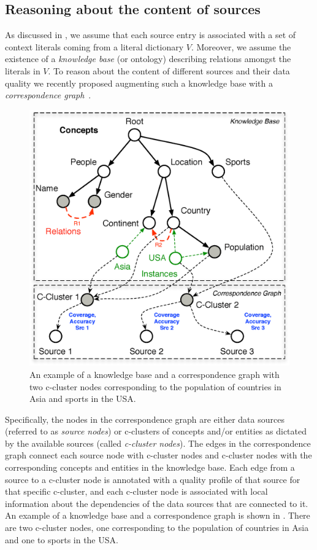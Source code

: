 \documentclass{vldb}
\begin{document}
\subsection{Reasoning about the content of sources}
\label{sec:reasoning}
As discussed in , we assume that each source entry is associated with a set of context literals coming from a literal dictionary $V$. Moreover, we assume the existence of a {\em knowledge base} (or ontology) describing relations amongst the literals in $V$.  To reason about the content of different sources and their data quality we recently proposed augmenting such a knowledge base with a {\em correspondence graph}~\cite{rekatsinas:2015}. 
\begin{figure}
	\begin{center}
	\includegraphics[clip,scale=0.25]{fig/kgcg}
	\caption{An example of a knowledge base and a correspondence graph with two c-cluster nodes corresponding to the population of countries in Asia and sports in the USA.}
	\label{fig:kgcg}
	\vspace{-20pt}
	\end{center}
\end{figure}
Specifically, the nodes in the correspondence graph are either data sources (referred to as {\em source nodes}) or c-clusters of concepts and/or entities as dictated by the available sources (called {\em c-cluster nodes}). The edges in the correspondence graph connect each source node with c-cluster nodes and c-cluster nodes with the corresponding concepts and entities in the knowledge base.  Each edge from a source to a c-cluster node is annotated with a quality profile of that source for that specific c-cluster, and each c-cluster node is associated with local information about the dependencies of the data sources that are connected to it. An example of a knowledge base and a correspondence graph is shown in . There are two c-cluster nodes, one corresponding to the population of countries in Asia and one to sports in the USA. 
\end{document}
